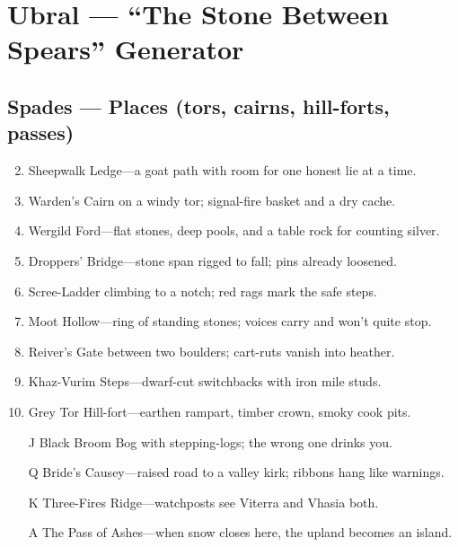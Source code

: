 \chapter{Ubral --- ``The Stone Between Spears'' Generator}
\label{chap:ubral}

\section*{Spades --- Places (tors, cairns, hill-forts, passes)}
\label{sec:ubral-places}
\begin{enumerate}
\setcounter{enumi}{1}
\item Sheepwalk Ledge---a goat path with room for one honest lie at a time.
\item Warden's Cairn on a windy tor; signal-fire basket and a dry cache.
\item Wergild Ford---flat stones, deep pools, and a table rock for counting silver.
\item Droppers' Bridge---stone span rigged to fall; pins already loosened.
\item Scree-Ladder climbing to a notch; red rags mark the safe steps.
\item Moot Hollow---ring of standing stones; voices carry and won't quite stop.
\item Reiver's Gate between two boulders; cart-ruts vanish into heather.
\item Khaz-Vurim Steps---dwarf-cut switchbacks with iron mile studs.
\item Grey Tor Hill-fort---earthen rampart, timber crown, smoky cook pits.
\item[J] Black Broom Bog with stepping-logs; the wrong one drinks you.
\item[Q] Bride's Causey---raised road to a valley kirk; ribbons hang like warnings.
\item[K] Three-Fires Ridge---watchposts see Viterra and Vhasia both.
\item[A] The Pass of Ashes---when snow closes here, the upland becomes an island.
\end{enumerate}

